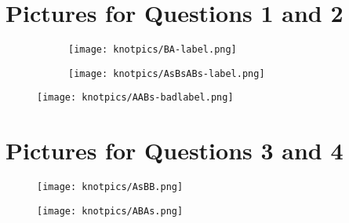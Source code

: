 \documentclass[12pt,letterpaper]{article}
\theoremstyle{definition}
\begin{document}
\setlength{\parskip}{1ex plus 0.5ex minus 0.2ex}
\setlength{\parindent}{0pt}

\pagestyle{fancy}
\cfoot{}


\section*{Pictures for Questions 1 and 2}

\begin{figure}[h!]
    \begin{subfigure}[b]{0.4\textwidth}
        \texttt{[image: knotpics/BA-label.png]}
    \end{subfigure}
    \qquad
    \begin{subfigure}[b]{0.4\textwidth}
        \texttt{[image: knotpics/AsBsABs-label.png]}
    \end{subfigure}
\end{figure}

\begin{figure}[h]
    \texttt{[image: knotpics/AABs-badlabel.png]}
\end{figure}

\clearpage


\section*{Pictures for Questions 3 and 4}

\begin{figure}[h]
    \texttt{[image: knotpics/AsBB.png]}
\end{figure}

\begin{figure}[h]
    \texttt{[image: knotpics/ABAs.png]}
\end{figure}
\end{document}

